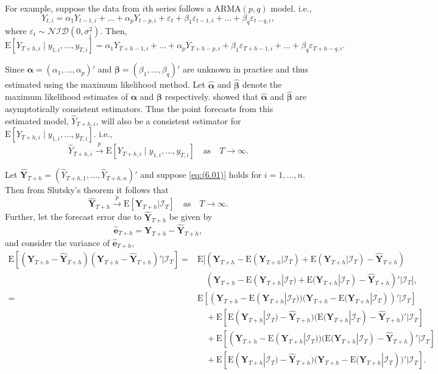 \documentclass[a4paper, 11pt]{article}
\def\E{\text{E}}
\theoremstyle{theo}
\theoremstyle{definition}
\begin{document}
For example, suppose the data from $i$th series follows a ARMA$(p,q)$ model. i.e.,
$$
Y_{t,i}=\alpha_1Y_{t-1,i}+\dots+\alpha_pY_{t-p,i}+\varepsilon_t + \beta_1\varepsilon_{t-1,i}+\dots+\beta_q\varepsilon_{t-q,i},
$$
where $\varepsilon_t \sim \mathcal{NID}(0, \sigma_i^2)$. Then,
$$
\E[Y_{T+h,i}\mid y_{1,i},\dots,y_{T,i}] = \alpha_1Y_{T+h-1,i}+\dots+\alpha_pY_{T+h-p,i}+ \beta_1\varepsilon_{T+h-1,i}+\dots+\beta_q\varepsilon_{T+h-q,i}.
$$

Since $\bm{\alpha} = (\alpha_1,\dots,\alpha_p)'$ and $\bm{\beta} = (\beta_1,\dots,\beta_q)'$ are unknown in practice and thus estimated using the maximum likelihood method. Let $\bm{\hat{\alpha}}$ and $\bm{\hat{\beta}}$ denote the maximum likelihood estimates of $\bm{\alpha}$ and $\bm{\beta}$ respectively. \citet{Yao2006} showed that $\bm{\hat{\alpha}}$ and $\bm{\hat{\beta}}$ are asymptotically consistent estimators. Thus the point forecasts from this estimated model, $\hat{Y}_{T+h,i}$, will also be a consistent estimator for $\E[Y_{T+h,i}\mid y_{1,i},\dots,y_{T,i}]$. i.e.,
\begin{equation} \label{eq:(6.01)}
\hat{Y}_{T+h,i} \overset{p}{\to} \E[Y_{T+h,i}\mid y_{1,i},\dots,y_{T,i}] \quad \text{as} \quad T \to \infty.
\end{equation}

Let $\hat{\bm{Y}}_{T+h}=(\hat{Y}_{T+h,1},\dots,\hat{Y}_{T+h,n})'$ and suppose \eqref{eq:(6.01)} holds for $i=1,\dots,n$. Then from Slutsky's theorem it follows that
\begin{equation}\label{eq:(6.02)}
\hat{\bm{Y}}_{T+h} \overset{p}{\to} \E[\bm{Y}_{T+h}|\bm{\mathcal{I}}_T] \quad \text{as} \quad T \to \infty.
\end{equation}
Further, let the forecast error due to $\hat{\bm{Y}}_{T+h}$ be given by
\begin{equation}
\hat{\bm{e}}_{T+h} = \bm{Y}_{T+h}-\hat{\bm{Y}}_{T+h},
\end{equation}
and consider the variance of $\hat{\bm{e}}_{T+h}$,
\begin{align*}
\E[(\bm{Y}_{T+h} - \hat{\bm{Y}}_{T+h})(\bm{Y}_{T+h} - \hat{\bm{Y}}_{T+h})'|\bm{\mathcal{I}}_T] = &
\E[(\bm{Y}_{T+h} - \E(\bm{Y}_{T+h}|\bm{\mathcal{I}}_T) + \E(\bm{Y}_{T+h}|\bm{\mathcal{I}}_T)- \hat{\bm{Y}}_{T+h})\\
& \quad
(\bm{Y}_{T+h} - \E(\bm{Y}_{T+h}|\bm{\mathcal{I}}_T) + \E(\bm{Y}_{T+h}|\bm{\mathcal{I}}_T) - \hat{\bm{Y}}_{T+h})'|\bm{\mathcal{I}}_T],\\
= &
\E[(\bm{Y}_{T+h} - \E(\bm{Y}_{T+h}|\bm{\mathcal{I}}_T))(\bm{Y}_{T+h} - \E(\bm{Y}_{T+h}|\bm{\mathcal{I}}_T))'|\bm{\mathcal{I}}_T]\\
& \quad
+ \E[\E(\bm{Y}_{T+h}|\bm{\mathcal{I}}_T) - \hat{\bm{Y}}_{T+h})(\E(\bm{Y}_{T+h}|\bm{\mathcal{I}}_T) - \hat{\bm{Y}}_{T+h})'|\bm{\mathcal{I}}_T]\\
& \quad
+  \E[(\bm{Y}_{T+h} - \E(\bm{Y}_{T+h}|\bm{\mathcal{I}}_T))(\E(\bm{Y}_{T+h}|\bm{\mathcal{I}}_T) - \hat{\bm{Y}}_{T+h})'|\bm{\mathcal{I}}_T]\\
&  \quad
+ \E[\E(\bm{Y}_{T+h}|\bm{\mathcal{I}}_T) - \hat{\bm{Y}}_{T+h})(\bm{Y}_{T+h} - \E(\bm{Y}_{T+h}|\bm{\mathcal{I}}_T))'|\bm{\mathcal{I}}_T].
\end{align*}
\end{document}

